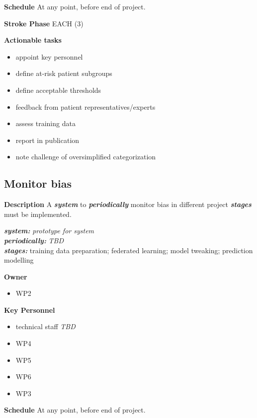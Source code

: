 \documentclass[
  letterpaper,
  DIV=11,
  numbers=noendperiod]{scrreport}
\providecommand{\tightlist}{%
  \setlength{\itemsep}{0pt}\setlength{\parskip}{0pt}}\usepackage{longtable,booktabs,array}
\begin{document}
\textbf{Schedule} At any point, before end of project.

\textbf{Stroke Phase} EACH (3)

\textbf{Actionable tasks}

\begin{itemize}
\tightlist
\item
  appoint key personnel
\item
  define at-risk patient subgroups
\item
  define acceptable thresholds
\item
  feedback from patient representatives/experts
\item
  assess training data
\item
  report in publication
\item
  note challenge of oversimplified categorization
\end{itemize}

\hypertarget{monitor-bias}{%
\subsection{Monitor bias}\label{monitor-bias}}

\textbf{Description} A \textbf{\emph{system}} to
\textbf{\emph{periodically}} monitor bias in different project
\textbf{\emph{stages}} must be implemented.

\textbf{\emph{system:}} \emph{prototype for system}\\
\textbf{\emph{periodically:}} \emph{TBD}\\
\textbf{\emph{stages:}} training data preparation; federated learning;
model tweaking; prediction modelling

\textbf{Owner}

\begin{itemize}
\tightlist
\item
  WP2
\end{itemize}

\textbf{Key Personnel}

\begin{itemize}
\tightlist
\item
  technical staff \emph{TBD}
\item
  WP4
\item
  WP5
\item
  WP6
\item
  WP3
\end{itemize}

\textbf{Schedule} At any point, before end of project.
\end{document}
